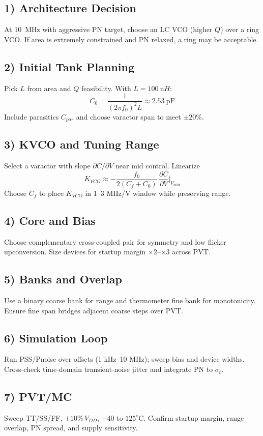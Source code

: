 \subsection*{1) Architecture Decision}
At \SI{10}{\mega\hertz} with aggressive PN target, choose an LC VCO (higher $Q$) over a ring VCO. If area is extremely constrained and PN relaxed, a ring may be acceptable.

\subsection*{2) Initial Tank Planning}
Pick $L$ from area and $Q$ feasibility. With $L=\SI{100}{\nano H}$:
\[
 C_0 = \frac{1}{(2\pi f_0)^2 L} \approx \SI{2.53}{\pF}
\]
Include parasitics $C_{par}$ and choose varactor span to meet $\pm20\%$.

\subsection*{3) KVCO and Tuning Range}
Select a varactor with slope $\partial C/\partial V$ near mid control. Linearize
\[
 K_{VCO} \approx -\frac{f_0}{2(C_f+C_0)}\,\frac{\partial C}{\partial V}\Big|_{V_{mid}}
\]
Choose $C_f$ to place $K_{VCO}$ in 1--3 \si{\mega Hz/V} window while preserving range.

\subsection*{4) Core and Bias}
Choose complementary cross-coupled pair for symmetry and low flicker upconversion. Size devices for startup margin $\times 2$--$\times 3$ across PVT.

\subsection*{5) Banks and Overlap}
Use a binary coarse bank for range and thermometer fine bank for monotonicity. Ensure fine span bridges adjacent coarse steps over PVT.

\subsection*{6) Simulation Loop}
Run PSS/Pnoise over offsets (1 kHz--10 MHz); sweep bias and device widths. Cross-check time-domain transient-noise jitter and integrate PN to $\sigma_t$.

\subsection*{7) PVT/MC}
Sweep TT/SS/FF, $\pm10\%\,V_{DD}$, $-40$ to $125^\circ$C. Confirm startup margin, range overlap, PN spread, and supply sensitivity.


